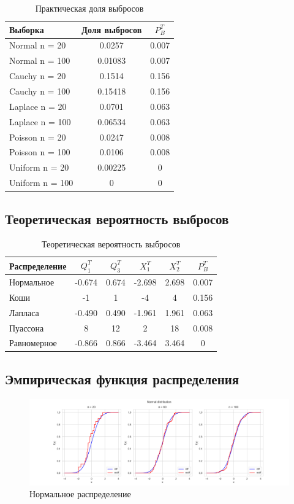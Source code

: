 \documentclass[a4paper,14pt]{article}
\begin{document}
	\begin{table}[H]
		\centering
		\begin{tabular}{|l|c|c|}
			\hline
			Выборка & Доля выбросов	& $P^T_B$\\\hline
			\hline
			Normal n = 20 & 0.0257 & 0.007\\\hline
			Normal n = 100 & 0.01083 & 0.007\\\hline
			Cauchy n = 20 & 0.1514 & 0.156\\\hline
			Cauchy n = 100 & 0.15418 & 0.156\\\hline
			Laplace n = 20 & 0.0701 & 0.063\\\hline
			Laplace n = 100 & 0.06534 & 0.063\\\hline
			Poisson n = 20 & 0.0247 & 0.008\\\hline
			Poisson n = 100 & 0.0106 & 0.008\\\hline
			Uniform n = 20 & 0.00225 & 0\\\hline
			Uniform n = 100 & 0 & 0\\\hline
		\end{tabular}
		\caption{Практическая доля выбросов}
	\end{table}
	\subsection{Теоретическая вероятность выбросов}
	\begin{table}[H]
		\centering
		\begin{tabular}{|l|c|c|c|c|c|}
			\hline
			Распределение & $Q_1^T$	& $Q_3^T$ & $X_1^T$ & $X_2^T$ & $P_B^T$\\\hline
			\hline
			Нормальное & -0.674 & 0.674 & -2.698 &  2.698 & 0.007\\\hline
			Коши & -1 & 1 & -4 & 4 & 0.156\\\hline
			Лапласа & -0.490 & 0.490 & -1.961 & 1.961 & 0.063\\\hline
			Пуассона & 8 & 12 & 2 & 18 & 0.008\\\hline
			Равномерное & -0.866 & 0.866 & -3.464 & 3.464 & 0\\\hline
		\end{tabular}
		\caption{Теоретическая вероятность выбросов}
	\end{table}
	
	\subsection{Эмпирическая функция распределения}
	\begin{figure}[H]
		\centering
		\includegraphics[scale=0.35]{../image/lab4/lab4_ecdf_norm.png}
		\caption{Нормальное распределение}
	\end{figure}
	
\end{document}
